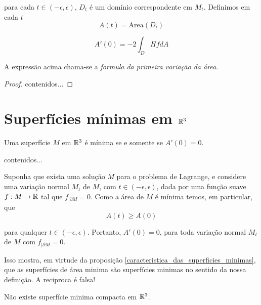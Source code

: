 para cada $t \in (-\epsilon,\epsilon)$, $D_t$ é um domínio correspondente em $M_t$. Definimos em cada $t$
\begin{equation*}
A(t) = \text{Area}(D_t)
\end{equation*}

\begin{teorema}
	\begin{equation*}
	A'(0) = -2 \int_D Hf dA
	\end{equation*}
\end{teorema}

A expressão acima chama-se a \emph{formula da primeira variação da área}.

\begin{proof}
	contenidos...
\end{proof}

\section{Superfícies mínimas em $\mathbb{R}^3$}

\begin{proposicao}\label{caracteristica_das_superficies_minimas}
	Uma superfície $M$ em $\mathbb{R}^3$ é mínima se e somente se $A'(0) = 0$.
\end{proposicao}

\begin{demonstracao}
	contenidos...
\end{demonstracao}

\begin{observacao}
	Suponha que exista uma solução $M$ para o problema de Lagrange, e considere uma variação normal $M_t$ de $M$, com $t \in (-\epsilon,\epsilon)$, dada por uma função suave $f: M \rightarrow \mathbb{R}$ tal que $f_{|\partial M} = 0$. Como a área de $M$ é mínima temos, em particular, que
	\begin{equation*}
	A(t) \geq A(0)
	\end{equation*}
	
	para qualquer $t \in (-\epsilon,\epsilon)$. Portanto, $A'(0)=0$, para toda variação normal $M_t$ de $M$ com $f_{|\partial M}=0$.
	
	Isso mostra, em virtude da proposição \ref{caracteristica_das_superficies_minimas}, que as superfícies de área minima são superfícies minimas no sentido da nossa definição. A reciproca é falsa!
\end{observacao}

\begin{proposicao}
	Não existe superfície minima compacta em $\mathbb{R}^3$.
\end{proposicao}

